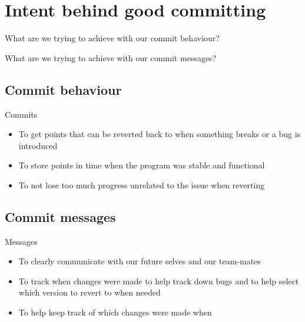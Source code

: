 \section{Intent behind good committing}
\begin{frame}
\begin{question}
    What are we trying to achieve with our commit behaviour?
\end{question}
\pause
\begin{question}
    What are we trying to achieve with our commit messages?
\end{question}
\end{frame}


\subsection{Commit behaviour}

\begin{frame}
\begin{block}{Commits}
  \begin{itemize}
      \item To get points that can be reverted back to when something breaks or a bug is introduced
      \pause
      \item To store points in time when the program was stable and functional
      \pause
      \item To not lose too much progress unrelated to the issue when reverting
  \end{itemize}
\end{block}
\end{frame}

\subsection{Commit messages}

\begin{frame}
\begin{block}{Messages}
  \begin{itemize}
      \item To clearly communicate with our future selves and our team-mates
      \pause
      \item To track when changes were made to help track down bugs and to help select which version to revert to when needed
      \pause
      \item To help keep track of which changes were made when
  \end{itemize}
\end{block}
\end{frame}

